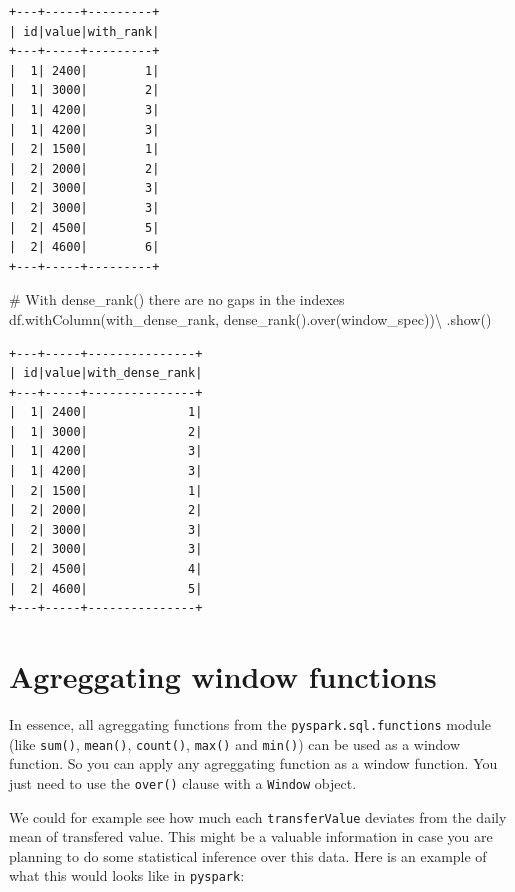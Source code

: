 \documentclass[
  11pt,
  letterpaper,
  DIV=11,
  numbers=noendperiod]{scrreprt}
\newenvironment{Shaded}{\begin{snugshade}}{\end{snugshade}}
\newcommand{\CommentTok}[1]{\textcolor[rgb]{0.37,0.37,0.37}{#1}}
\newcommand{\NormalTok}[1]{\textcolor[rgb]{0.00,0.23,0.31}{#1}}
\newcommand{\OperatorTok}[1]{\textcolor[rgb]{0.37,0.37,0.37}{#1}}
\newcommand{\StringTok}[1]{\textcolor[rgb]{0.13,0.47,0.30}{#1}}
\begin{document}
\begin{verbatim}
+---+-----+---------+
| id|value|with_rank|
+---+-----+---------+
|  1| 2400|        1|
|  1| 3000|        2|
|  1| 4200|        3|
|  1| 4200|        3|
|  2| 1500|        1|
|  2| 2000|        2|
|  2| 3000|        3|
|  2| 3000|        3|
|  2| 4500|        5|
|  2| 4600|        6|
+---+-----+---------+
\end{verbatim}

\begin{Shaded}
\begin{Highlighting}[]
\CommentTok{\# With dense\_rank() there are no gaps in the indexes}
\NormalTok{df.withColumn(}\StringTok{\textquotesingle{}with\_dense\_rank\textquotesingle{}}\NormalTok{, dense\_rank().over(window\_spec))}\OperatorTok{\textbackslash{}}
\NormalTok{    .show()}
\end{Highlighting}
\end{Shaded}

\begin{verbatim}
+---+-----+---------------+
| id|value|with_dense_rank|
+---+-----+---------------+
|  1| 2400|              1|
|  1| 3000|              2|
|  1| 4200|              3|
|  1| 4200|              3|
|  2| 1500|              1|
|  2| 2000|              2|
|  2| 3000|              3|
|  2| 3000|              3|
|  2| 4500|              4|
|  2| 4600|              5|
+---+-----+---------------+
\end{verbatim}

\section{Agreggating window
functions}\label{agreggating-window-functions}

In essence, all agreggating functions from the
\texttt{pyspark.sql.functions} module (like \texttt{sum()},
\texttt{mean()}, \texttt{count()}, \texttt{max()} and \texttt{min()})
can be used as a window function. So you can apply any agreggating
function as a window function. You just need to use the \texttt{over()}
clause with a \texttt{Window} object.

We could for example see how much each \texttt{transferValue} deviates
from the daily mean of transfered value. This might be a valuable
information in case you are planning to do some statistical inference
over this data. Here is an example of what this would looks like in
\texttt{pyspark}:
\end{document}
